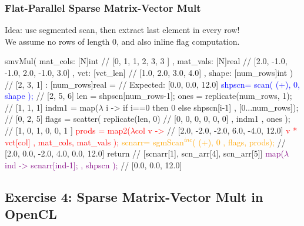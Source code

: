 \documentclass{beamer}
\newcommand{\red}[1]{\textcolor{Red}{{#1}}}
\newcommand{\blue}[1]{\textcolor{Blue}{{#1}}}
\newcommand{\orange}[1]{\textcolor{Orange}{{#1}}}
\newcommand{\purple}[1]{\textcolor{Purple}{{#1}}}
\newcommand{\emp}[1]{\textcolor{DikuRed}{ #1}}
\newcommand{\emphh}[1]{\textcolor{CosGreen}{ #1}}
\newcommand{\mymath}[1]{$ #1 $}
\newcommand{\myindu}[1]{^{#1}}
\begin{document}
\begin{frame}[fragile,t]
  \frametitle{Flat-Parallel Sparse Matrix-Vector Mult}

\emphh{Idea: use segmented scan, then extract last element in every row!}\\
We assume no rows of length 0, and also inline flag computation.

\begin{colorcode}
smvMul( mat_cols: [N]int       \emp{// [0,    1,    1,   2,    3,   3  ]}
      , mat_vals: [N]real      \emp{// [2.0, -1.0, -1.0, 2.0, -1.0, 3.0]}
      , vct: [vct_len]         \emp{// [1.0,  2.0,  3.0, 4.0]}
      , shape: [num_rows]int ) \emp{// [2,    3,    1]}
      : [num_rows]real =       \emp{// Expected: [0.0, 0.0, 12.0]}
  \blue{shpscn= scan( (+), 0, shape );}       \emp{// [2, 5, 6]}
  \emphh{len   = shpscn[num_rows-1];}
  \emphh{ones  = replicate(num_rows, 1);}      \emp{// [1, 1, 1]}
  \emphh{indm1 = map(\mymath{\lambda} i -> if i==0 then 0}
                     \emphh{else shpscn[i-1]}
                    \emphh{, [0...num_rows]);} \emp{// [0, 2, 5]}
  \emphh{flags = scatter( replicate(len, 0)}   \emp{// [0, 0, 0, 0, 0, 0]}
                 \emphh{, indm1}              
                 \emphh{, ones );}     \emp{// [1,    0,    1,   0,    0,   1  ]}
  \red{prods = map2(\mymath{\lambda}col v ->}       \emp{// [2.0, -2.0, -2.0, 6.0, -4.0, 12.0]} 
                    \red{v * vct[col]} 
              \red{, mat_cols, mat_vals );}
  \orange{scnarr= sgmScan\mymath{\myindu{inc}}( (+), 0}
              \orange{, flags, prods);} \emp{// [2.0, 0.0, -2.0, 4.0, 0.0, 12.0]}\pause
  return                       \emp{// [scnarr[1], scn_arr[4], scn_arr[5]]}
    \purple{map(\mymath{\lambda} ind -> scnarr[ind-1];}
       \purple{, shpscn );}             \emp{// [0.0, 0.0, 12.0]}
\end{colorcode}

\end{frame}

\subsection{Exercise 4: Sparse Matrix-Vector Mult in OpenCL}
\end{document}
